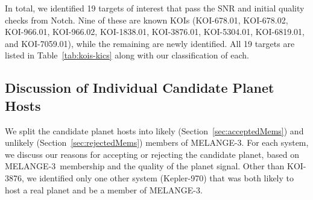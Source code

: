 \documentclass[twocolumn, linenumbers]{aastex631}
\newcommand{\association}{MELANGE-3}
\newcommand{\starname}{KOI-3876}
\newcommand{\starnametwo}{Kepler-970}
\begin{document}
In total, we identified 19 targets of interest that pass the SNR and initial quality checks from Notch. Nine of these are known KOIs (KOI-678.01, KOI-678.02, KOI-966.01, KOI-966.02, KOI-1838.01, KOI-3876.01, KOI-5304.01, KOI-6819.01, and KOI-7059.01), while the remaining are newly identified. All 19 targets are listed in Table~\ref{tab:kois-kics} along with our classification of each. 

\subsection{Discussion of Individual Candidate Planet Hosts}

We split the candidate planet hosts into likely (Section~\ref{sec:acceptedMems}) and unlikely (Section~\ref{sec:rejectedMems}) members  of \association. For each system, we discuss our reasons for accepting or rejecting the candidate planet, based on \association\ membership and the quality of the planet signal. Other than \starname, we identified only one other system (\starnametwo) that was both likely to host a real planet and be a member of \association. 
\end{document}
